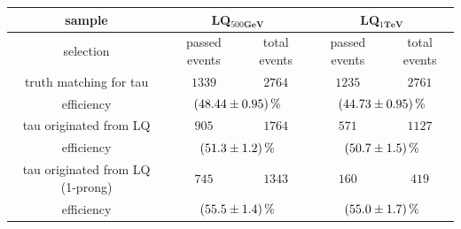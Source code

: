 	\begin{table}
		\centering
                \footnotesize
                \renewcommand{\arraystretch}{1.2}
		\begin{tabular*}{\linewidth}{@{\extracolsep{\fill}}ccccc}
		\hline
		\hline
		 \textbf{sample}  & \multicolumn{2}{c}{\textbf{LQ$_{500\textbf{GeV}}$}}  & \multicolumn{2}{c}{\textbf{LQ$_{1\textbf{TeV}}$}} 
		\\
		\hline
		selection  & passed events      & total events & passed events      & total events
		\\ 
		\hline
		truth matching for tau      & $1339$            & $2764$      & $1235$        & $2761$
		\\
		efficiency                  & \multicolumn{2}{c}{$\SI{48.44\pm 0.95}{\percent}$}    & \multicolumn{2}{c}{$\SI{44.73\pm 0.95}{\percent}$}
		\\
		\hline
                tau originated from LQ& $905$        & $1764$         & $571$          & $1127$
		\\
		efficiency                  & \multicolumn{2}{c}{$\SI{51.3\pm 1.2}{\percent}$}   & \multicolumn{2}{c}{$\SI{50.7\pm 1.5}{\percent}$}
		\\
		\hline
                tau originated from LQ (1-prong)& $745$        & $1343$         & $160$          & $419$
		\\
		efficiency                  & \multicolumn{2}{c}{$\SI{55.5\pm 1.4}{\percent}$}   & \multicolumn{2}{c}{$\SI{55.0\pm 1.7}{\percent}$}
		\\

\end{tabular*}
\end{table}
